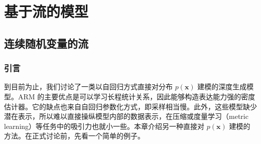\chapter{基于流的模型}
\section{连续随机变量的流}
\subsection{引言}

到目前为止，我们讨论了一类以自回归方式直接对分布 $p(\mathbf{x})$ 建模的深度生成模型。ARM 的主要优点是可以学习长程统计关系，因此能够构造表达能力强的密度估计器。它的缺点也来自自回归参数化方式，即采样相当慢。此外，这些模型缺少潜在表示，所以难以直接操纵模型内部的数据表示，在压缩或度量学习（metric learning）等任务中的吸引力也就小一些。本章介绍另一种直接对 $p(\mathbf{x})$ 建模的方法。在正式讨论前，先看一个简单的例子。

